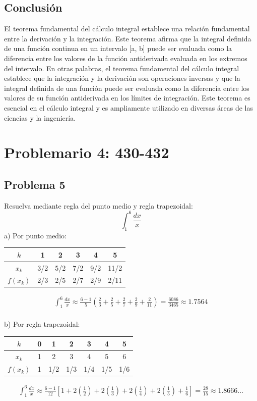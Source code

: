 \documentclass{article}
\begin{document}
\subsection{Conclusión}
El teorema fundamental del cálculo integral establece una relación fundamental entre la derivación y la integración. Este teorema afirma que la integral definida de una función continua en un intervalo [a, b] puede ser evaluada como la diferencia entre los valores de la función antiderivada evaluada en los extremos del intervalo. En otras palabras, el teorema fundamental del cálculo integral establece que la integración y la derivación son operaciones inversas y que la integral definida de una función puede ser evaluada como la diferencia entre los valores de su función antiderivada en los límites de integración. Este teorema es esencial en el cálculo integral y es ampliamente utilizado en diversas áreas de las ciencias y la ingeniería.

\section{Problemario 4: 430-432}
\subsection{Problema 5}
Resuelva mediante regla del punto medio y regla trapezoidal:
$$
  \int_{1}^{6}\frac{dx}{x}
$$
a) Por punto medio: \\
\begin{center}
  \begin{tabular}{|c|c|c|c|c|c|}
    \hline
    $ k $      & 1   & 2   & 3   & 4   & 5    \\
    \hline
    $ x_k $    & 3/2 & 5/2 & 7/2 & 9/2 & 11/2 \\
    \hline
    $ f(x_k) $ & 2/3 & 2/5 & 2/7 & 2/9 & 2/11 \\
    \hline
  \end{tabular}
\end{center}

\begin{align*}
  \int_{1}^{6}\frac{dx}{x} \approx \frac{6-1}{5} \left(\frac{2}{3}+\frac{2}{5}+\frac{2}{7}+\frac{2}{9}+\frac{2}{11}\right) = \frac{6086}{3465} \approx 1.7564
\end{align*}
\\
b) Por regla trapezoidal:

\begin{center}
  \begin{tabular}{|c|c|c|c|c|c|c|}
    \hline
    $ k $      & 0 & 1   & 2   & 3   & 4   & 5   \\
    \hline
    $ x_k $    & 1 & 2   & 3   & 4   & 5   & 6   \\
    \hline
    $ f(x_k) $ & 1 & 1/2 & 1/3 & 1/4 & 1/5 & 1/6 \\
    \hline
  \end{tabular}
\end{center}
\begin{align*}
  \int_{1}^{6}\frac{dx}{x} \approx \frac{6-1}{12} \left[1+2\left(\frac{1}{2}\right)+2\left(\frac{1}{3}\right)+2\left(\frac{1}{4}\right)+2\left(\frac{1}{5}\right)+\frac{1}{6}\right] = \frac{28}{15} \approx 1.8666\dots
\end{align*}
\end{document}
